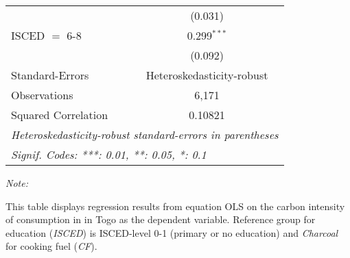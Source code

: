 \begin{table}[htbp!]
\begin{adjustbox}{width = 1\textwidth, max height = 0.95\textheight, center}
\begin{threeparttable}[b]
\begin{tabular}{lc}
                                & (0.031)\\   
            ISCED $=$ 6-8       & 0.299$^{***}$\\   
                                & (0.092)\\   
            \midrule 
            Standard-Errors     & Heteroskedasticity-robust \\   
            Observations        & 6,171\\  
            Squared Correlation & 0.10821\\  
            \midrule \midrule
            \multicolumn{2}{l}{\emph{Heteroskedasticity-robust standard-errors in parentheses}}\\
            \multicolumn{2}{l}{\emph{Signif. Codes: ***: 0.01, **: 0.05, *: 0.1}}\\
         \end{tabular}
         
         \begin{tablenotes}\item \medskip \textit{Note:}
            \item This table displays regression results from equation OLS on the carbon intensity of consumption in  in Togo as the dependent variable. Reference group for education (\textit{ISCED}) is ISCED-level 0-1 (primary or no education) and \textit{Charcoal} for cooking fuel (\textit{CF}).
         \end{tablenotes}
      \end{threeparttable}
   \end{adjustbox}
\end{table}


